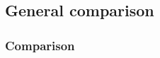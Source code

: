 \subsection{General comparison}

\begin{frame}
  \MyLogo
  \frametitle{Comparison}  
  


\end{frame}
